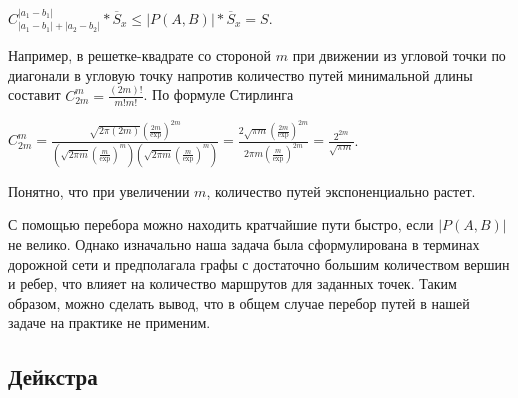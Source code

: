 \documentclass[12pt, a4paper]{article}
\begin{document}
\begin{center}
	$C^{|a_1-b_1|}_{|a_1-b_1| + |a_2-b_2|} * \overline S_x  \leq  \vert P(A,B) \vert * \overline S_x = S$.
\end{center}

Например, в решетке-квадрате со стороной $m$ при движении из угловой точки по диагонали в угловую точку напротив количество путей минимальной длины составит $C^m_{2m} = \frac{(2m)!}{m!m!} $. По формуле Стирлинга
\begin{center}
 $ C^m_{2m} = \frac{\sqrt{2\pi(2m)} \left( \frac{2m}{\exp} \right)^{2m}}{\left(\sqrt{2\pi m} \left( \frac{m}{\exp} \right)^m \right)  \left(\sqrt{2\pi m} \left( \frac{m}{\exp} \right)^m \right)} = \frac{2\sqrt{\pi m} \left( \frac{2m}{\exp} \right)^{2m}}{2\pi m \left( \frac{m}{\exp} \right)^{2m}} = \frac{2^{2m}}{\sqrt{\pi m}}$.
\end{center}
Понятно, что при увеличении $m$, количество путей экспоненциально растет.

С помощью перебора можно находить кратчайшие пути быстро, если $|P(A,B)|$ не велико. Однако изначально наша задача была сформулирована в терминах дорожной сети и предполагала графы с достаточно большим количеством вершин и ребер, что влияет на количество маршрутов для заданных точек. Таким образом, можно сделать вывод, что в общем случае перебор путей в нашей задаче на практике не применим.

\newpage
\subsection{Дейкстра}
\end{document}
